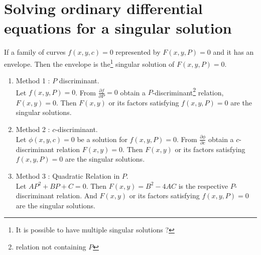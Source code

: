 \section{Solving ordinary differential equations for a singular solution}
\begin{definition}
	If a family of curves $f(x,y,c) = 0$ represented by $F(x,y,P) = 0$ and it has an envelope. Then the envelope is the\footnote{It is possible to have multiple singular solutions ?} singular solution of $F(x,y,P) = 0$.
\end{definition}
\begin{enumerate}
	\item Method 1 : $P$ discriminant.\\
		Let $f(x,y,P) = 0$.
		From $\frac{\partial f}{\partial P} = 0$ obtain a $P$-discriminant\footnote{relation not containing $P$} relation, $F(x,y) = 0$. Then $F(x,y)$ or its factors satisfying $f(x,y,P) = 0$ are the singular solutions.
	\item Method 2 : $c$-discriminant.\\
		Let $\phi(x,y,c) = 0$ be a solution for $f(x,y,P) = 0$.
		From $\frac{\partial \phi}{\partial c}$ obtain a $c$-discriminant relation $F(x,y) = 0$.
		Then $F(x,y)$ or its factors satisfying $f(x,y,P) = 0$ are the singular solutions.
	\item Method 3 : Quadratic Relation in $P$.\\
		Let $AP^2 + BP + C = 0$.
		Then $F(x,y) = B^2-4AC$ is the respective $P$-discriminant relation.
		And $F(x,y)$ or its factors satisfying $f(x,y,P) = 0$ are the singular solutions.
\end{enumerate}

